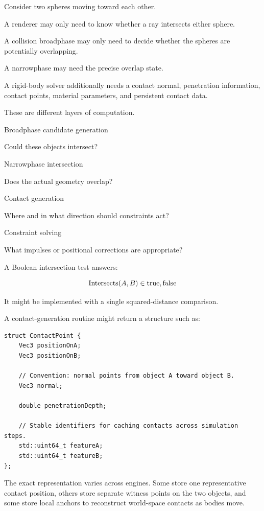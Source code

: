 Consider two spheres moving toward each other.

A renderer may only need to know whether a ray intersects either sphere.

A collision broadphase may only need to decide whether the spheres are potentially overlapping.

A narrowphase may need the precise overlap state.

A rigid-body solver additionally needs a contact normal, penetration information, contact points, material parameters, and persistent contact data.

These are different layers of computation.

Broadphase candidate generation

Could these objects intersect?

Narrowphase intersection

Does the actual geometry overlap?

Contact generation

Where and in what direction should constraints act?

Constraint solving

What impulses or positional corrections are appropriate?

A Boolean intersection test answers:

\[
\operatorname{Intersects}(A,B)\in\\{\mathrm{true},\mathrm{false}\\}
\]

It might be implemented with a single squared-distance comparison.

A contact-generation routine might return a structure such as:

\begin{verbatim}
struct ContactPoint {
    Vec3 positionOnA;
    Vec3 positionOnB;

    // Convention: normal points from object A toward object B.
    Vec3 normal;

    double penetrationDepth;

    // Stable identifiers for caching contacts across simulation steps.
    std::uint64_t featureA;
    std::uint64_t featureB;
};
\end{verbatim}

The exact representation varies across engines. Some store one representative contact position, others store separate witness points on the two objects, and some store local anchors to reconstruct world-space contacts as bodies move.

